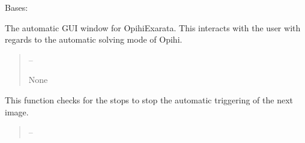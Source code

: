 \documentclass[letterpaper,11pt,english]{sphinxmanual}
\begin{document}
\begin{savenotes}\begin{fulllineitems}
\label{\detokenize{code/opihiexarata.gui.automatic:opihiexarata.gui.automatic.OpihiAutomaticWindow}}
\pysigstartsignatures
{}
\pysigstopsignatures
\sphinxAtStartPar
Bases: 

\begin{savenotes}\begin{fulllineitems}
\label{\detokenize{code/opihiexarata.gui.automatic:opihiexarata.gui.automatic.OpihiAutomaticWindow.__init__}}
\pysigstartsignatures
{}
\pysigstopsignatures
\sphinxAtStartPar
The automatic GUI window for OpihiExarata. This interacts with
the user with regards to the automatic solving mode of Opihi.
\begin{quote}\begin{description}
\sphinxAtStartPar
{} – 

\sphinxAtStartPar
None

\end{description}\end{quote}

\end{fulllineitems}\end{savenotes}


\begin{savenotes}\begin{fulllineitems}
\label{\detokenize{code/opihiexarata.gui.automatic:opihiexarata.gui.automatic.OpihiAutomaticWindow._automatic_triggering_check_stops}}
\pysigstartsignatures
{}
\pysigstopsignatures
\sphinxAtStartPar
This function checks for the stops to stop the automatic triggering
of the next image.
\begin{quote}\begin{description}
\sphinxAtStartPar
{} – 


\end{description}
\end{quote}
\end{fulllineitems}
\end{savenotes}
\end{fulllineitems}
\end{savenotes}
\end{document}
